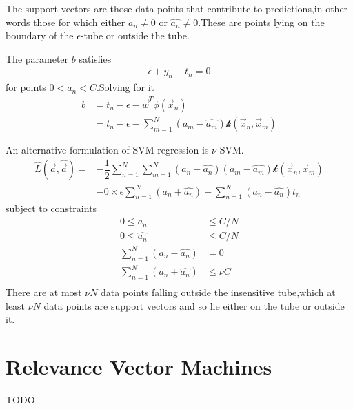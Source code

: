 The support vectors are those data points that contribute to predictions,in other words those for which either $a_n \neq 0$ or $\hat{a_n} \neq 0$.These are points lying on the boundary of the $\epsilon$-tube or outside the tube.

The parameter $b$ satisfies 
\begin{align}
\epsilon+y_n-t_n= 0
\end{align}
for points $0<a_n<C$.Solving for it
\begin{align}
b &= t_n-\epsilon-\vec{w}^T\phi(\vec{x}_n) \\
  &= t_n-\epsilon-\sum_{m=1}^{N}(a_m-\hat{a_m})\mathcal{k}(\vec{x}_n,\vec{x}_m)
\end{align}

An alternative formulation of SVM regression is $\nu$ SVM.
\begin{align}
\hat{L}(\vec{a},\hat{\vec{a}}) =&-\dfrac{1}{2}\sum_{n=1}^{N}\sum_{m=1}^{N}(a_n-\hat{a_n})(a_m-\hat{a_m})\mathcal{k}(\vec{x}_n,\vec{x}_m) \\
&-0\times\epsilon\sum_{n=1}^{N}(a_n+\hat{a_n})+\sum_{n=1}^{N}(a_n-\hat{a_n})t_n
\end{align}
subject to constraints
\begin{align}
0\leq a_n &\leq C/N\\
0\leq \hat{a_n} &\leq C/N \\
\sum_{n=1}^{N}(a_n-\hat{a_n}) &=0 \\
\sum_{n=1}^{N}(a_n+\hat{a_n}) &\leq \nu C \\
\end{align}
There are at most $\nu N$ data points falling outside the insensitive tube,which at least $\nu N$ data points are support vectors and so lie either on the tube or outside it.

\section{Relevance Vector Machines}
TODO









